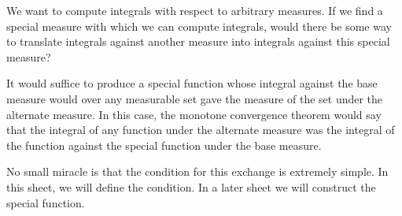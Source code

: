 
\sbasic










































\sstart
{}


We want to compute integrals
with respect to arbitrary measures.
If we find a special measure
with which we can compute integrals,
would there
be some way to translate
integrals against another measure
into integrals against this special
measure?

It would suffice to produce a special function
whose integral against the base measure
would over any measurable set gave
the measure of the set under the alternate
measure.
In this case, the monotone convergence
theorem would say that the integral of
any function under the alternate
measure was the integral of the function
against the special function under the
base measure.

No small miracle is that the condition
for this exchange is extremely simple.
In this sheet, we will define the
condition. In a later sheet we will
construct the special function.

